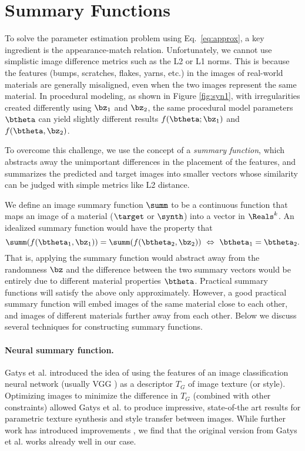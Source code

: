 \section{Summary Functions}
\label{sec:summary_func}

To solve the parameter estimation problem using Eq.~\eqref{eq:approx}, a key ingredient is the appearance-match relation.
Unfortunately, we cannot use simplistic image difference metrics such as the L2 or L1 norms.
This is because the features (bumps, scratches, flakes, yarns, etc.) in the images of real-world materials are generally misaligned, even when the two images represent the same material.
In procedural modeling, as shown in Figure \ref{fig:syn1}, with irregularities created differently using $\bz_1$ and $\bz_2$, the same procedural model parameters $\btheta$ can yield slightly different results $f(\btheta; \bz_1)$ and $f(\btheta, \bz_2)$.



To overcome this challenge, we use the concept of a \emph{summary function}, which abstracts away the unimportant differences in the placement of the features, and summarizes the predicted and target images into smaller vectors whose similarity can be judged with simple metrics like L2 distance.

We define an image summary function $\summ$ to be a continuous function that maps an image of a material ($\target$ or $\synth$) into a vector in $\Reals^k$. An idealized summary function would have the property that
%
\begin{equation}
	\summ(f(\btheta_1, \bz_1)) = \summ(f(\btheta_2, \bz_2)) \ \Leftrightarrow \ \btheta_1 = \btheta_2.
\end{equation}
%
That is, applying the summary function would %
abstract away from the randomness $\bz$ and the difference between the two summary vectors would be entirely due to different material properties $\btheta$. Practical summary functions will satisfy the above only approximately. However, a good practical summary function will embed images of the same material close to each other, and images of different materials further away from each other. Below we discuss several techniques for constructing summary functions.

\paragraph*{Neural summary function.}
Gatys et al. \cite{Gatys2015,Gatys2016} introduced the idea of using the features of an image classification neural network (usually VGG \cite{VGG}) as a descriptor $T_G$ of image texture (or style). Optimizing images to minimize the difference in $T_G$ (combined with other constraints) allowed Gatys et al. to produce impressive, state-of-the art results for parametric texture synthesis and style transfer between images. While further work  has introduced improvements \cite{Risser2017}, we find that the original version from Gatys et al. works already well in our case.

